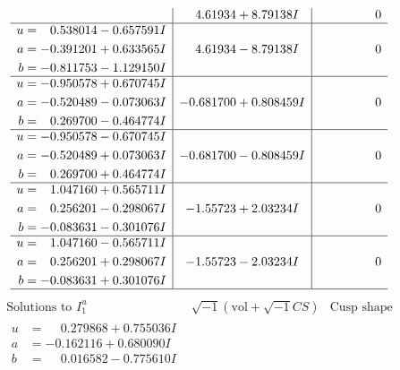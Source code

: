 \documentclass[1p]{elsarticle_modified}
\theoremstyle{definition}
\newcommand{\I}{\sqrt{-1}}
\begin{document}
$$\begin{array}{c|c|c}
 & \phantom{-}4.61934 + 8.79138 I & \phantom{-0.000000 } 0 \\ \hline\begin{aligned}
u &= \phantom{-}0.538014 - 0.657591 I \\
a &= -0.391201 + 0.633565 I \\
b &= -0.811753 - 1.129150 I\end{aligned}
 & \phantom{-}4.61934 - 8.79138 I & \phantom{-0.000000 } 0 \\ \hline\begin{aligned}
u &= -0.950578 + 0.670745 I \\
a &= -0.520489 - 0.073063 I \\
b &= \phantom{-}0.269700 - 0.464774 I\end{aligned}
 & -0.681700 + 0.808459 I & \phantom{-0.000000 } 0 \\ \hline\begin{aligned}
u &= -0.950578 - 0.670745 I \\
a &= -0.520489 + 0.073063 I \\
b &= \phantom{-}0.269700 + 0.464774 I\end{aligned}
 & -0.681700 - 0.808459 I & \phantom{-0.000000 } 0 \\ \hline\begin{aligned}
u &= \phantom{-}1.047160 + 0.565711 I \\
a &= \phantom{-}0.256201 - 0.298067 I \\
b &= -0.083631 - 0.301076 I\end{aligned}
 & -1.55723 + 2.03234 I & \phantom{-0.000000 } 0 \\ \hline\begin{aligned}
u &= \phantom{-}1.047160 - 0.565711 I \\
a &= \phantom{-}0.256201 + 0.298067 I \\
b &= -0.083631 + 0.301076 I\end{aligned}
 & -1.55723 - 2.03234 I & \phantom{-0.000000 } 0\\
 \hline 
 \end{array}$$\newpage$$\begin{array}{c|c|c}  
\text{Solutions to }I^u_{1}& \I (\text{vol} + \sqrt{-1}CS) & \text{Cusp shape}\\
 \hline 
\begin{aligned}
u &= \phantom{-}0.279868 + 0.755036 I \\
a &= -0.162116 + 0.680090 I \\
b &= \phantom{-}0.016582 - 0.775610 I\end{aligned}

\end{array}$$
\end{document}
